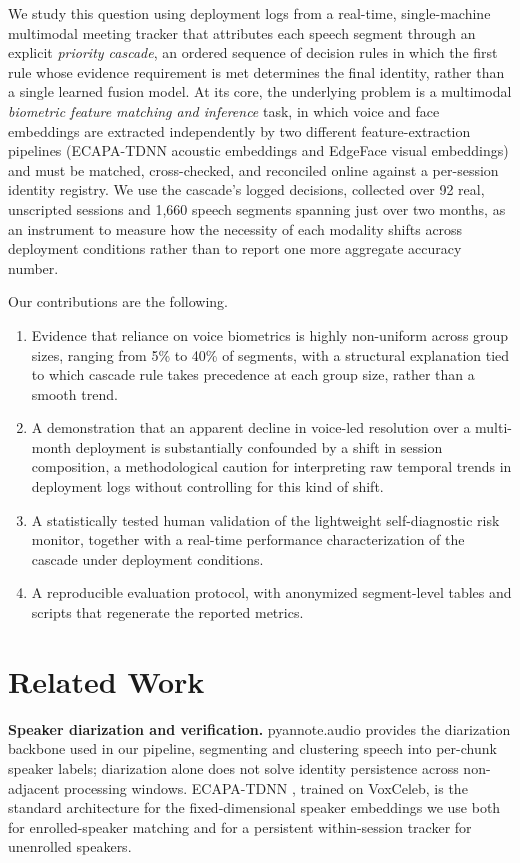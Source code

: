 \documentclass[conference]{IEEEtran}
\begin{document}
We study this question using deployment logs from a real-time,
single-machine multimodal meeting tracker that attributes each speech
segment through an explicit \emph{priority cascade}, an ordered
sequence of decision rules in which the first rule whose evidence
requirement is met determines the final identity, rather than a single
learned fusion model. At its core, the underlying problem is a
multimodal \emph{biometric feature matching and inference} task, in
which voice and face embeddings are extracted independently by two
different feature-extraction pipelines (ECAPA-TDNN acoustic embeddings
and EdgeFace visual embeddings) and must be matched, cross-checked, and
reconciled online against a per-session identity registry. We use the
cascade's logged decisions, collected over 92 real, unscripted sessions
and 1{,}660 speech segments spanning just over two months, as an
instrument to measure how the necessity of each modality shifts across
deployment conditions rather than to report one more aggregate accuracy
number.

Our contributions are the following.

\begin{enumerate}
\item Evidence that reliance on voice biometrics is highly non-uniform
across group sizes, ranging from 5\% to 40\% of segments, with a
structural explanation tied to which cascade rule takes precedence at
each group size, rather than a smooth trend.
\item A demonstration that an apparent decline in voice-led
resolution over a multi-month deployment is substantially confounded
by a shift in session composition, a methodological caution for
interpreting raw temporal trends in deployment logs without
controlling for this kind of shift.
\item A statistically tested human validation of the lightweight
self-diagnostic risk monitor, together with a real-time performance
characterization of the cascade under deployment conditions.
\item A reproducible evaluation protocol, with anonymized segment-level
tables and scripts that regenerate the reported metrics.
\end{enumerate}

\section{Related Work}

\textbf{Speaker diarization and verification.} pyannote.audio
\cite{bredin2020pyannote,bredin2023pyannote31} provides the diarization
backbone used in our pipeline, segmenting and clustering speech into
per-chunk speaker labels; diarization alone does not solve identity
persistence across non-adjacent processing windows. ECAPA-TDNN
\cite{desplanques2020ecapa}, trained on VoxCeleb, is the standard
architecture for the fixed-dimensional speaker embeddings we use both
for enrolled-speaker matching and for a persistent within-session
tracker for unenrolled speakers.
\end{document}
